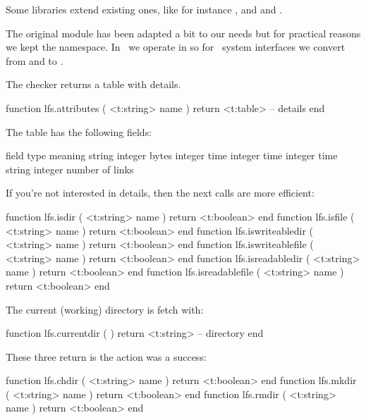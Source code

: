 Some libraries extend existing ones, like for instance , 
and  and .

\stopsubsection

\startsubsection[title=Extra file helpers]

The original  module has been adapted a bit to our needs but for
practical reasons we kept the namespace. In \LUAMETATEX\ we operate in 
so for \MSWINDOWS\ system interfaces we convert from and to .

The  checker returns a table with details.

\starttyping[option=LUA]
function lfs.attributes ( <t:string> name )
    return <t:table> -- details
end
\stoptyping

The table has the following fields:

\starttabulate[|T|||]
\FL
\BC field                \BC type    \BC meaning \NC \NR
\TL
\NC {}         \NC string  \NC {}    \NC \NR
\NC {}         \NC integer \NC bytes \NC \NR
\NC {} \NC integer \NC time \NC \NR
\NC {}       \NC integer \NC time \NC \NR
\NC {}       \NC integer \NC time \NC \NR
\NC {}  \NC string  \NC {} \NC \NR
\NC {}        \NC integer \NC number of links \NC \NR
\LL
\stoptabulate

If you're not interested in details, then the next calls are more efficient:

\starttyping[option=LUA]
function lfs.isdir           ( <t:string> name ) return <t:boolean> end
function lfs.isfile          ( <t:string> name ) return <t:boolean> end
function lfs.iswriteabledir  ( <t:string> name ) return <t:boolean> end
function lfs.iswriteablefile ( <t:string> name ) return <t:boolean> end
function lfs.isreadabledir   ( <t:string> name ) return <t:boolean> end
function lfs.isreadablefile  ( <t:string> name ) return <t:boolean> end
\stoptyping

The current (working) directory is fetch with:

\starttyping[option=LUA]
function lfs.currentdir ( )
    return <t:string> -- directory
end
\stoptyping

These three return  is the action was a success:

\starttyping[option=LUA]
function lfs.chdir ( <t:string> name ) return <t:boolean> end
function lfs.mkdir ( <t:string> name ) return <t:boolean> end
function lfs.rmdir ( <t:string> name ) return <t:boolean> end
\stoptyping

